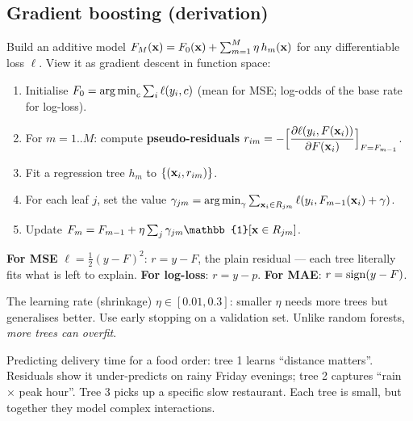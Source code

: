 \subsection{Gradient boosting (derivation)}
Build an additive model $F_M(\mathbf{x})=F_0(\mathbf{x})+\sum_{m=1}^M\eta\,h_m(\mathbf{x})$ for any differentiable loss $\ell$. View it as gradient descent in function space:
\begin{enumerate}
  \item Initialise $F_0=\operatorname*{arg\,min}_c\sum_i\ell(y_i,c)$ (mean for MSE; log-odds of the base rate for log-loss).
  \item For $m=1..M$: compute \textbf{pseudo-residuals} $r_{im}=-\Big[\dfrac{\partial\ell(y_i,F(\mathbf{x}_i))}{\partial F(\mathbf{x}_i)}\Big]_{F=F_{m-1}}$.
  \item Fit a regression tree $h_m$ to $\{(\mathbf{x}_i,r_{im})\}$.
  \item For each leaf $j$, set the value $\gamma_{jm}=\operatorname*{arg\,min}_{\gamma}\sum_{\mathbf{x}_i\in R_{jm}}\ell(y_i,F_{m-1}(\mathbf{x}_i)+\gamma)$.
  \item Update $F_m=F_{m-1}+\eta\sum_j\gamma_{jm}\mathbb{1}[\x\in R_{jm}]$.
\end{enumerate}
\textbf{For MSE} $\ell=\frac12(y-F)^2$: $r=y-F$, the plain residual --- each tree literally fits what is left to explain. \textbf{For log-loss}: $r=y-p$. \textbf{For MAE}: $r=\operatorname{sign}(y-F)$.

The learning rate (shrinkage) $\eta\in[0.01,0.3]$: smaller $\eta$ needs more trees but generalises better. Use early stopping on a validation set. Unlike random forests, \emph{more trees can overfit}.

\begin{realworld}
Predicting delivery time for a food order: tree 1 learns ``distance matters''. Residuals show it under-predicts on rainy Friday evenings; tree 2 captures ``rain $\times$ peak hour''. Tree 3 picks up a specific slow restaurant. Each tree is small, but together they model complex interactions.
\end{realworld}

